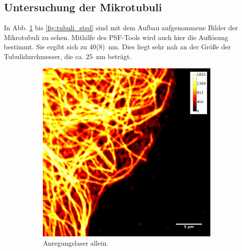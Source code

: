 \subsection{Untersuchung der Mikrotubuli}
In Abb. \ref{fig:nosted} bis \ref{fig:tubuli_sted} sind mit dem Aufbau aufgenommene Bilder der Mikrotubuli zu sehen.
Mithilfe des PSF-Tools wird auch hier die Auflösung bestimmt. 
Sie ergibt sich zu 40(8)~nm. Dies liegt sehr nah an der Größe der Tubulidurchmesser, die ca. 25~nm beträgt.
\begin{figure}
\centering
\begin{subfigure}{0.3\textwidth}
	\includegraphics[width=\textwidth]{plots/normal_noSTED_measurement_with_bar.jpg}
	\caption{Anregungslaser allein.}\label{fig:nosted}
\end{subfigure}
~
\begin{subfigure}{0.3\textwidth}

\end{subfigure}
\end{figure}
